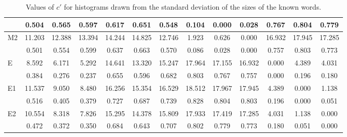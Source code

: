 \begin{table*}[h!]
\begin{center}
\begin{tabular}{| l | c | c | c | c | c | c | c | c | c | c | c | c |}
 & 0.504  & 0.565  & 0.597  & 0.617  & 0.651  & 0.548  & 0.104  & 0.000  & 0.028  & 0.767  & 0.804  & 0.779 \\\hline
M2 & 11.203  & 12.388  & 13.394  & 14.244  & 14.825  & 12.746  & 1.923  & 0.626  & 0.000  & 16.932  & 17.945  & 17.285 \\\hline
 & 0.501  & 0.554  & 0.599  & 0.637  & 0.663  & 0.570  & 0.086  & 0.028  & 0.000  & 0.757  & 0.803  & 0.773 \\\hline
E & 8.592  & 6.171  & 5.292  & 14.641  & 13.320  & 15.247  & 17.964  & 17.155  & 16.932  & 0.000  & 4.389  & 4.031 \\\hline
 & 0.384  & 0.276  & 0.237  & 0.655  & 0.596  & 0.682  & 0.803  & 0.767  & 0.757  & 0.000  & 0.196  & 0.180 \\\hline
E1 & 11.537  & 9.050  & 8.480  & 16.256  & 15.354  & 16.529  & 18.512  & 17.967  & 17.945  & 4.389  & 0.000  & 1.138 \\\hline
 & 0.516  & 0.405  & 0.379  & 0.727  & 0.687  & 0.739  & 0.828  & 0.804  & 0.803  & 0.196  & 0.000  & 0.051 \\\hline
E2 & 10.554  & 8.318  & 7.826  & 15.295  & 14.378  & 15.809  & 17.933  & 17.419  & 17.285  & 4.031  & 1.138  & 0.000 \\\hline
 & 0.472  & 0.372  & 0.350  & 0.684  & 0.643  & 0.707  & 0.802  & 0.779  & 0.773  & 0.180  & 0.051  & 0.000 \\\hline
\end{tabular}
\caption{Values of $c'$ for histograms drawn from the standard deviation of the sizes of the known words.}
\end{center}
\end{table*}
